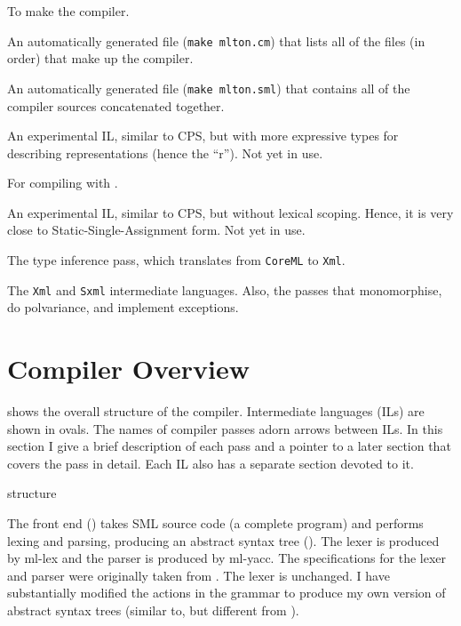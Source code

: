 \begin{description}
To make the compiler.

An automatically generated file ({\tt make mlton.cm}) that lists all of the
files (in order) that make up the compiler.

An automatically generated file ({\tt make mlton.sml}) that contains all of the
compiler sources concatenated together.

An experimental IL, similar to CPS, but with more expressive types for
describing representations (hence the ``r'').  Not yet in use.

For compiling with {\smlnj}.

An experimental IL, similar to CPS, but without lexical scoping.  Hence, it is
very close to Static-Single-Assignment form.  Not yet in use.

The type inference pass, which translates from {\tt CoreML} to {\tt Xml}.

The {\tt Xml} and {\tt Sxml} intermediate languages.  Also, the passes that
monomorphise, do polvariance, and implement exceptions.

\end{description}

\section{Compiler Overview}

 shows the overall structure of the compiler.  Intermediate
languages (ILs) are shown in ovals.  The names of compiler passes adorn arrows
between ILs.  In this section I give a brief description of each pass and a
pointer to a later section that covers the pass in detail.  Each IL also has a
separate section devoted to it.
\figBegin
\centerline{}
       {structure}

The front end () takes SML source code (a complete
program) and performs lexing and parsing, producing an abstract syntax
tree ().  The lexer is produced by
ml-lex\cite{AppelEtAl94} and the parser is produced by
ml-yacc\cite{TarditiAppel94}.  The specifications for 
the lexer and parser were originally taken from .  The
lexer is unchanged.  I have substantially modified the actions in the
grammar to produce my own version of abstract syntax trees (similar
to, but different from {\smlnj}).

